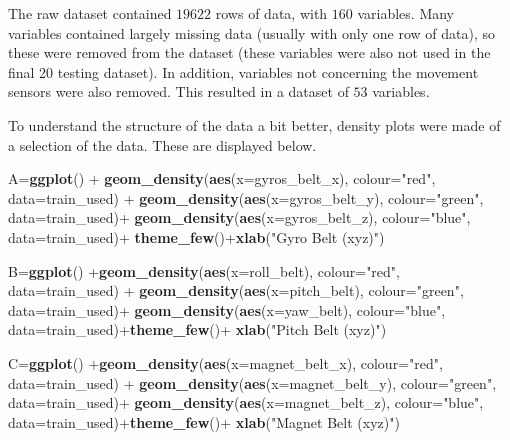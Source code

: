 \documentclass[]{article}
\newenvironment{Shaded}{\begin{snugshade}}{\end{snugshade}}
\newcommand{\KeywordTok}[1]{\textcolor[rgb]{0.13,0.29,0.53}{\textbf{{#1}}}}
\newcommand{\DataTypeTok}[1]{\textcolor[rgb]{0.13,0.29,0.53}{{#1}}}
\newcommand{\StringTok}[1]{\textcolor[rgb]{0.31,0.60,0.02}{{#1}}}
\newcommand{\NormalTok}[1]{{#1}}
\begin{document}
The raw dataset contained \(19622\) rows of data, with \(160\)
variables. Many variables contained largely missing data (usually with
only one row of data), so these were removed from the dataset (these
variables were also not used in the final 20 testing dataset). In
addition, variables not concerning the movement sensors were also
removed. This resulted in a dataset of \(53\) variables.

To understand the structure of the data a bit better, density plots were
made of a selection of the data. These are displayed below.

\begin{Shaded}
\begin{Highlighting}[]
\NormalTok{A=}\KeywordTok{ggplot}\NormalTok{() +}\StringTok{ }\KeywordTok{geom_density}\NormalTok{(}\KeywordTok{aes}\NormalTok{(}\DataTypeTok{x=}\NormalTok{gyros_belt_x), }\DataTypeTok{colour=}\StringTok{"red"}\NormalTok{, }\DataTypeTok{data=}\NormalTok{train_used) +}\StringTok{ }
\StringTok{  }\KeywordTok{geom_density}\NormalTok{(}\KeywordTok{aes}\NormalTok{(}\DataTypeTok{x=}\NormalTok{gyros_belt_y), }\DataTypeTok{colour=}\StringTok{"green"}\NormalTok{, }\DataTypeTok{data=}\NormalTok{train_used)+}
\StringTok{  }\KeywordTok{geom_density}\NormalTok{(}\KeywordTok{aes}\NormalTok{(}\DataTypeTok{x=}\NormalTok{gyros_belt_z), }\DataTypeTok{colour=}\StringTok{"blue"}\NormalTok{, }\DataTypeTok{data=}\NormalTok{train_used)+}
\StringTok{  }\KeywordTok{theme_few}\NormalTok{()+}\KeywordTok{xlab}\NormalTok{(}\StringTok{"Gyro Belt (xyz)"}\NormalTok{)}

\NormalTok{B=}\KeywordTok{ggplot}\NormalTok{() +}\KeywordTok{geom_density}\NormalTok{(}\KeywordTok{aes}\NormalTok{(}\DataTypeTok{x=}\NormalTok{roll_belt), }\DataTypeTok{colour=}\StringTok{"red"}\NormalTok{, }\DataTypeTok{data=}\NormalTok{train_used) +}
\StringTok{  }\KeywordTok{geom_density}\NormalTok{(}\KeywordTok{aes}\NormalTok{(}\DataTypeTok{x=}\NormalTok{pitch_belt), }\DataTypeTok{colour=}\StringTok{"green"}\NormalTok{, }\DataTypeTok{data=}\NormalTok{train_used)+}
\StringTok{  }\KeywordTok{geom_density}\NormalTok{(}\KeywordTok{aes}\NormalTok{(}\DataTypeTok{x=}\NormalTok{yaw_belt), }\DataTypeTok{colour=}\StringTok{"blue"}\NormalTok{, }\DataTypeTok{data=}\NormalTok{train_used)+}\KeywordTok{theme_few}\NormalTok{()+}
\StringTok{  }\KeywordTok{xlab}\NormalTok{(}\StringTok{"Pitch Belt (xyz)"}\NormalTok{)}

\NormalTok{C=}\KeywordTok{ggplot}\NormalTok{() +}\KeywordTok{geom_density}\NormalTok{(}\KeywordTok{aes}\NormalTok{(}\DataTypeTok{x=}\NormalTok{magnet_belt_x), }\DataTypeTok{colour=}\StringTok{"red"}\NormalTok{, }\DataTypeTok{data=}\NormalTok{train_used) +}
\StringTok{  }\KeywordTok{geom_density}\NormalTok{(}\KeywordTok{aes}\NormalTok{(}\DataTypeTok{x=}\NormalTok{magnet_belt_y), }\DataTypeTok{colour=}\StringTok{"green"}\NormalTok{, }\DataTypeTok{data=}\NormalTok{train_used)+}
\StringTok{  }\KeywordTok{geom_density}\NormalTok{(}\KeywordTok{aes}\NormalTok{(}\DataTypeTok{x=}\NormalTok{magnet_belt_z), }\DataTypeTok{colour=}\StringTok{"blue"}\NormalTok{, }\DataTypeTok{data=}\NormalTok{train_used)+}\KeywordTok{theme_few}\NormalTok{()+}
\StringTok{  }\KeywordTok{xlab}\NormalTok{(}\StringTok{"Magnet Belt (xyz)"}\NormalTok{)}


\end{Highlighting}
\end{Shaded}
\end{document}
